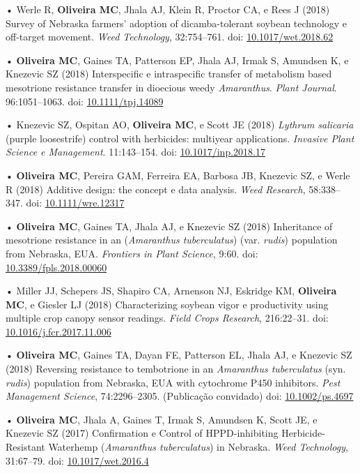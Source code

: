 \documentclass[11pt,]{article}
\begin{document}
• Werle R, \textbf{Oliveira MC}, Jhala AJ, Klein R, Proctor CA, e Rees J
(2018) Survey of Nebraska farmers' adoption of dicamba-tolerant soybean
technology e off-target movement. \emph{Weed Technology}, 32:754--761.
doi: \href{https://doi.org/10.1017/wet.2018.62}{10.1017/wet.2018.62}

• \textbf{Oliveira MC}, Gaines TA, Patterson EP, Jhala AJ, Irmak S,
Amundsen K, e Knezevic SZ (2018) Interspecific e intraspecific transfer
of metabolism based mesotrione resistance transfer in dioecious weedy
\emph{Amaranthus}. \emph{Plant Journal}. 96:1051--1063. doi:
\href{https://onlinelibrary.wiley.com/doi/full/10.1111/tpj.14089}{10.1111/tpj.14089}

• Knezevic SZ, Ospitan AO, \textbf{Oliveira MC}, e Scott JE (2018)
\emph{Lythrum salicaria} (purple loosestrife) control with herbicides:
multiyear applications. \emph{Invasive Plant Science e Management}.
11:143--154. doi:
\href{https://doi.org/10.1017/inp.2018.17}{10.1017/inp.2018.17}

• \textbf{Oliveira MC}, Pereira GAM, Ferreira EA, Barbosa JB, Knezevic
SZ, e Werle R (2018) Additive design: the concept e data analysis.
\emph{Weed Research}, 58:338--347. doi:
\href{https://onlinelibrary.wiley.com/doi/full/10.1111/wre.12317}{10.1111/wre.12317}

• \textbf{Oliveira MC}, Gaines TA, Jhala AJ, e Knezevic SZ (2018)
Inheritance of mesotrione resistance in an (\emph{Amaranthus
tuberculatus}) (var. \emph{rudis}) population from Nebraska, EUA.
\emph{Frontiers in Plant Science}, 9:60. doi:
\href{https://www.frontiersin.org/articles/10.3389/fpls.2018.00060/full}{10.3389/fpls.2018.00060}

• Miller JJ, Schepers JS, Shapiro CA, Arnenson NJ, Eskridge KM,
\textbf{Oliveira MC}, e Giesler LJ (2018) Characterizing soybean vigor e
productivity using multiple crop canopy sensor readings. \emph{Field
Crops Research}, 216:22--31. doi:
\href{https://www.sciencedirect.com/science/article/pii/S0378429017310341}{10.1016/j.fcr.2017.11.006}

• \textbf{Oliveira MC}, Gaines TA, Dayan FE, Patterson EL, Jhala AJ, e
Knezevic SZ (2018) Reversing resistance to tembotrione in an
\emph{Amaranthus tuberculatus} (syn. \emph{rudis}) population from
Nebraska, EUA with cytochrome P450 inhibitors. \emph{Pest Management
Science}, 74:2296--2305. (Publicação convidado) doi:
\href{https://onlinelibrary.wiley.com/doi/full/10.1002/ps.4697}{10.1002/ps.4697}

• \textbf{Oliveira MC}, Jhala A, Gaines T, Irmak S, Amundsen K, Scott
JE, e Knezevic SZ (2017) Confirmation e Control of HPPD-inhibiting
Herbicide-Resistant Waterhemp (\emph{Amaranthus tuberculatus}) in
Nebraska. \emph{Weed Technology}, 31:67--79. doi:
\href{https://www.cambridge.org/core/journals/weed-technology/article/confirmation-e-control-of-hppdinhibiting-herbicideresistant-waterhemp-amaranthus-tuberculatus-in-nebraska/69C31C7039DBE3FD49A55C73EEE5F2EE}{10.1017/wet.2016.4}
\end{document}
